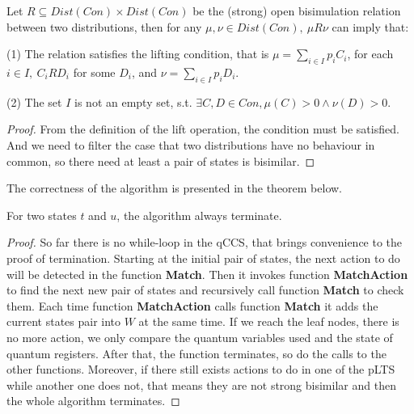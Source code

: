 \documentclass[runningheads]{llncs}
\begin{document}
\begin{theorem}

Let $\textit{R}\subseteq Dist(Con)\times Dist(Con)$ be the (strong) open bisimulation relation between two distributions, then for any $\mu,\nu\in Dist(Con),\ \mu\textit{R}\nu$ can imply that:
\begin{item}
\item[(1)] The relation satisfies the lifting condition, that is $\mu=\sum_{i\in I}p_i\textit{C}_i$, for each $i\in I,\ \textit{C}_i\textit{R}\textit{D}_i$ for some $\textit{D}_i$, and $\nu=\sum_{i\in I}p_i\textit{D}_i$.
\item[(2)] The set $I$ is not an empty set, s.t. $\exists C,D\in Con, \mu(C)>0\wedge\nu(D)>0$.
\end{item}
\end{theorem} 
\begin{proof}
From the definition of the lift operation, the condition must be satisfied. And we need to filter the case that two distributions have no behaviour in common, so there need at least a pair of states is bisimilar.
\end{proof}
The correctness of the algorithm is presented in the theorem below.
\begin{theorem}[Termination]
For two states $t$ and $u$, the algorithm always terminate.
\end{theorem} 
\begin{proof}
So far there is no while-loop in the qCCS, that brings convenience to the proof of termination. Starting at the initial pair of states, the next action to do will be detected in the function \textbf{Match}. Then it invokes function \textbf{MatchAction} to find the next new pair of states and recursively call function \textbf{Match} to check them. Each time function \textbf{MatchAction} calls function \textbf{Match} it adds the current states pair into $W$ at the same time. If we reach the leaf nodes, there is no more action, we only compare the quantum variables used and the state of quantum registers. After that, the function terminates, so do the calls to the other functions. Moreover, if there still exists actions to do in one of the pLTS while another one does not, that means they are not strong bisimilar and then the whole algorithm terminates. 
\end{proof}
\end{document}

